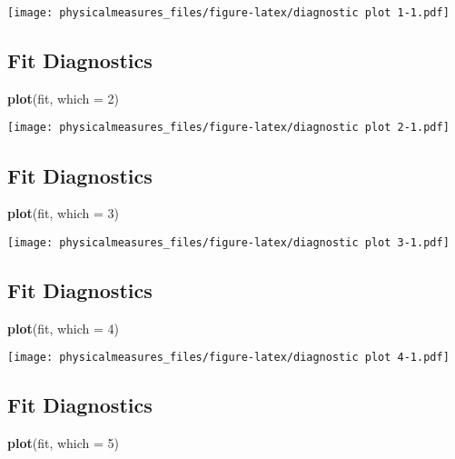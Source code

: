 \documentclass[]{article}
\newenvironment{Shaded}{\begin{snugshade}}{\end{snugshade}}
\newcommand{\KeywordTok}[1]{\textcolor[rgb]{0.13,0.29,0.53}{\textbf{#1}}}
\newcommand{\DataTypeTok}[1]{\textcolor[rgb]{0.13,0.29,0.53}{#1}}
\newcommand{\DecValTok}[1]{\textcolor[rgb]{0.00,0.00,0.81}{#1}}
\newcommand{\NormalTok}[1]{#1}
\begin{document}
\texttt{[image: physicalmeasures\_files/figure-latex/diagnostic plot 1-1.pdf]}

\subsection{Fit Diagnostics}\label{fit-diagnostics-5}

\begin{Shaded}
\begin{Highlighting}[]
\KeywordTok{plot}\NormalTok{(fit, }\DataTypeTok{which =} \DecValTok{2}\NormalTok{)}
\end{Highlighting}
\end{Shaded}

\texttt{[image: physicalmeasures\_files/figure-latex/diagnostic plot 2-1.pdf]}

\subsection{Fit Diagnostics}\label{fit-diagnostics-6}

\begin{Shaded}
\begin{Highlighting}[]
\KeywordTok{plot}\NormalTok{(fit, }\DataTypeTok{which =} \DecValTok{3}\NormalTok{)}
\end{Highlighting}
\end{Shaded}

\texttt{[image: physicalmeasures\_files/figure-latex/diagnostic plot 3-1.pdf]}

\subsection{Fit Diagnostics}\label{fit-diagnostics-7}

\begin{Shaded}
\begin{Highlighting}[]
\KeywordTok{plot}\NormalTok{(fit, }\DataTypeTok{which =} \DecValTok{4}\NormalTok{)}
\end{Highlighting}
\end{Shaded}

\texttt{[image: physicalmeasures\_files/figure-latex/diagnostic plot 4-1.pdf]}

\subsection{Fit Diagnostics}\label{fit-diagnostics-8}

\begin{Shaded}
\begin{Highlighting}[]
\KeywordTok{plot}\NormalTok{(fit, }\DataTypeTok{which =} \DecValTok{5}\NormalTok{)}
\end{Highlighting}
\end{Shaded}
\end{document}
